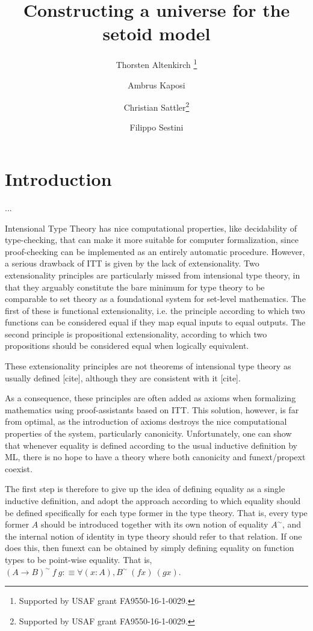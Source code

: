 \documentclass{easychair}
\title{Constructing a universe for the setoid model}
\author{
  Thorsten Altenkirch \inst{1}\thanks{Supported by USAF grant FA9550-16-1-0029.}
\and
  Ambrus Kaposi \inst{2}
\and
  Christian Sattler\inst{1}\thanks{Supported by USAF grant FA9550-16-1-0029.}
\and
  Filippo Sestini\inst{1}
}
\institute{
  School of Computer Science, University of Nottingham, UK\\
  \email{\{psztxa,pszcs1,psxfs5\}@nottingham.ac.uk}
  \and
  E{\"o}tv{\"o}s Lor{\'a}nd University, Budapest, Hungary\\
  \email{akaposi@inf.elte.hu}
}
\begin{document}
\maketitle

\section{Introduction}

...


Intensional Type Theory has nice computational properties, like decidability of
type-checking, that can make it more suitable for computer formalization, since
proof-checking can be implemented as an entirely automatic procedure.
%
However, a serious drawback of ITT is given by the lack of extensionality.
%
Two extensionality principles are particularly missed from intensional type
theory, in that they arguably constitute the bare minimum for type theory to be
comparable to set theory as a foundational system for set-level mathematics.
%
The first of these is functional extensionality, i.e. the principle according to
which two functions can be considered equal if they map equal inputs to equal
outputs.
%
The second principle is propositional extensionality, according to which two
propositions should be considered equal when logically equivalent.

These extensionality principles are not theorems of intensional type theory as
usually defined [cite], although they are consistent with it [cite].

As a consequence, these principles are often added as axioms when formalizing
mathematics using proof-assistants based on ITT. This solution, however, is far
from optimal, as the introduction of axioms destroys the nice computational
properties of the system, particularly canonicity. Unfortunately, one can show
that whenever equality is defined according to the usual inductive definition by
ML, there is no hope to have a theory where both canonicity and funext/propext
coexist.

The first step is therefore to give up the idea of defining equality as a single
inductive definition, and adopt the approach according to which equality should
be defined specifically for each type former in the type theory. That is, every
type former $A$ should be introduced together with its own notion of equality
$A^\sim$, and the internal notion of identity in type theory should refer to
that relation.
%
If one does this, then funext can be obtained by simply defining equality on
function types to be point-wise equality. That is, $(A \to B)^\sim\ f\ g :\equiv
\forall (x : A) , B^\sim\ (f x)\ (g x)$.
\end{document}
